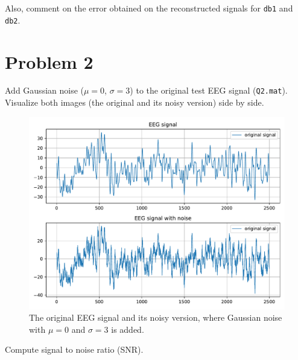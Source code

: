 \begin{tcolorbox}[colback=red!5!white,colframe=red!75!black,title=Problem 1.d]
    Also, comment on the error obtained on the reconstructed signals for \verb|db1| and \verb|db2|.
\end{tcolorbox}



\section*{Problem 2} \label{sec:problem2}

\begin{tcolorbox}[colback=green!5!white,boxrule=0pt,frame empty]
    Add Gaussian noise ($\mu = 0$, $\sigma = 3$) to the original test
    EEG signal (\verb|Q2.mat|).
    Visualize both images (the original and its noisy version) side by side.
\end{tcolorbox}

\begin{figure}[H]
    \centering
    \includegraphics[width=\textwidth]{./img/problem2-1-EEG-signal-with-and-without-noise.pdf}
    \caption{The original EEG signal and its noisy version, where Gaussian noise with $\mu = 0$ and $\sigma = 3$ is added.}
    \label{fig:EEG_with_and_without_noise}
\end{figure}

\vspace{0.5cm}

\begin{tcolorbox}[colback=green!5!white,colframe=green!75!black,title=Problem 2.a]
    Compute signal to noise ratio (SNR).
\end{tcolorbox}

